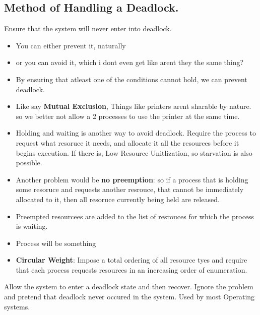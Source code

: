 \documentclass[11pt]{article}
\begin{document}
\subsection{Method of Handling a Deadlock. }
Ensure that the system will never enter into deadlock. 
\begin{itemize}
	\item You can either prevent it, naturally 
	\item or you can avoid it, which i dont even get like arent they the same thing?
	\item By ensuring that atleast one of the conditions cannot hold, we can prevent deadlock. 
	\item Like say \textbf{Mutual Exclusion}, Things like printers arent sharable by nature. so we better not allow a 2 processes to use the printer at the same time. 
	\item Holding and waiting is another way to avoid deadlock. Require the process to request what resoruce it needs, and allocate it all the resources before it begins execution. If there is, Low Resource Unitlization, so starvation is also possible.
	\item Another problem would be \textbf{no preemption}: so if a process that is holding some resoruce and requests another resrouce, that cannot be immediately allocated to it, then all resoruce currently being held are released. 
	\item Preempted resourcees are added to the list of resrouces for which the process is waiting. 
	\item Process will be something 
	\item \textbf{Circular Weight}:  Impose a total ordering of all resource tyes and require that each process requests resources in an increasing order of enumeration. 
\end{itemize}

Allow the system to enter a deadlock state and then recover. Ignore the problem and pretend that deadlock never occured in the system. Used by most Operating systems. 
\end{document}
